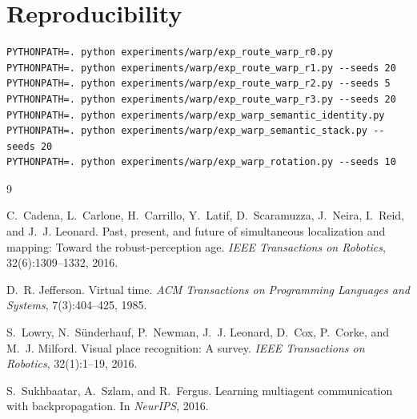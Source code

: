 \documentclass{article}
\begin{document}
\section{Reproducibility}
\label{app:repro}
\begin{verbatim}
PYTHONPATH=. python experiments/warp/exp_route_warp_r0.py
PYTHONPATH=. python experiments/warp/exp_route_warp_r1.py --seeds 20
PYTHONPATH=. python experiments/warp/exp_route_warp_r2.py --seeds 5
PYTHONPATH=. python experiments/warp/exp_route_warp_r3.py --seeds 20
PYTHONPATH=. python experiments/warp/exp_warp_semantic_identity.py
PYTHONPATH=. python experiments/warp/exp_warp_semantic_stack.py --seeds 20
PYTHONPATH=. python experiments/warp/exp_warp_rotation.py --seeds 10
\end{verbatim}

\begin{thebibliography}{9}

C.~Cadena, L.~Carlone, H.~Carrillo, Y.~Latif, D.~Scaramuzza,
J.~Neira, I.~Reid, and J.~J. Leonard.
\newblock Past, present, and future of simultaneous localization and
mapping: Toward the robust-perception age.
\newblock \emph{IEEE Transactions on Robotics}, 32(6):1309--1332, 2016.

D.~R. Jefferson.
\newblock Virtual time.
\newblock \emph{ACM Transactions on Programming Languages and Systems},
7(3):404--425, 1985.

S.~Lowry, N.~S\"underhauf, P.~Newman, J.~J. Leonard, D.~Cox,
P.~Corke, and M.~J. Milford.
\newblock Visual place recognition: A survey.
\newblock \emph{IEEE Transactions on Robotics}, 32(1):1--19, 2016.

S.~Sukhbaatar, A.~Szlam, and R.~Fergus.
\newblock Learning multiagent communication with backpropagation.
\newblock In \emph{NeurIPS}, 2016.

\end{thebibliography}
\end{document}
